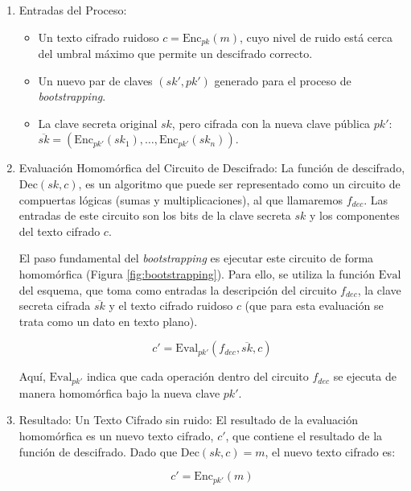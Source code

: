 \begin{enumerate}
    \item Entradas del Proceso:
    \begin{itemize}
        \item Un texto cifrado ruidoso $c = \text{Enc}_{pk}(m)$, cuyo nivel de ruido está cerca del umbral máximo que permite un descifrado correcto.
        \item Un nuevo par de claves $(sk', pk')$ generado para el proceso de \textit{bootstrapping}.
        \item La clave secreta original $sk$, pero cifrada con la nueva clave pública $pk'$: $\overline{sk} = (\text{Enc}_{pk'}(sk_1), \dots, \text{Enc}_{pk'}(sk_n))$.
    \end{itemize}

    \item Evaluación Homomórfica del Circuito de Descifrado:
    La función de descifrado, $\text{Dec}(sk, c)$, es un algoritmo que puede ser representado como un circuito de compuertas lógicas (sumas y multiplicaciones), al que llamaremos $f_{dec}$. Las entradas de este circuito son los bits de la clave secreta $sk$ y los componentes del texto cifrado $c$.

    El paso fundamental del \textit{bootstrapping} es ejecutar este circuito de forma homomórfica (Figura \ref{fig:bootstrapping}). Para ello, se utiliza la función $\text{Eval}$ del esquema, que toma como entradas la descripción del circuito $f_{dec}$, la clave secreta cifrada $\overline{sk}$ y el texto cifrado ruidoso $c$ (que para esta evaluación se trata como un dato en texto plano).
    
    \begin{equation}
        c' = \text{Eval}_{pk'}(f_{dec}, \overline{sk}, c)
    \end{equation}
    
    Aquí, $\text{Eval}_{pk'}$ indica que cada operación dentro del circuito $f_{dec}$ se ejecuta de manera homomórfica bajo la nueva clave $pk'$.

    \item Resultado: Un Texto Cifrado sin ruido:
    El resultado de la evaluación homomórfica es un nuevo texto cifrado, $c'$, que contiene el resultado de la función de descifrado. Dado que $\text{Dec}(sk, c) = m$, el nuevo texto cifrado es:
    
    \begin{equation}
        c' = \text{Enc}_{pk'}(m)
    \end{equation}
    

\end{enumerate}
